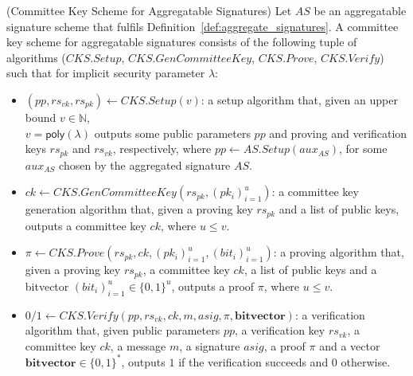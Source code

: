 \begin{definition}
\label{def: committee_key} (Committee Key Scheme for Aggregatable Signatures) Let $\mathit{AS}$ be an aggregatable signature scheme that fulfils 
Definition~\ref{def:aggregate_signatures}.  A committee key scheme for aggregatable signatures consists of the following tuple of algorithms 
($\mathit{CKS.Setup}$, $\mathit{CKS.GenCommitteeKey}$, $\mathit{CKS.Prove}$, $\mathit{CKS.Verify}$) 
such that for implicit security parameter $\lambda$: 

\begin{itemize}
\item $(\mathit{pp}, \mathit{rs}_{\mathit{vk}}, \mathit{rs}_{\mathit{pk}}) \leftarrow \mathit{CKS.Setup}(v)$: a setup algorithm that, 
given an upper bound $v \in \mathbb{N}$, \\ $v = \mathsf{poly}(\lambda)$ outputs some public parameters $\mathit{pp}$ and 
proving and verification keys $\mathit{rs}_{\mathit{pk}}$ and $\mathit{rs}_{\mathit{vk}}$, respectively,  
where $\mathit{pp} \leftarrow \mathit{AS.Setup}(\mathit{aux_{\mathit{AS}}})$, for some 
$\mathit{aux_{\mathit{AS}}}$ chosen by the aggregated signature $\mathit{AS}$.

\item $\mathit{ck} \leftarrow \mathit{CKS.GenCommitteeKey}(\mathit{rs}_{\mathit{pk}}, (\mathit{pk_i})_{i=1}^u)$: a committee key generation algorithm that, 
given a proving key $\mathit{rs}_{\mathit{pk}}$ and a list of public keys, 
outputs a committee key $\mathit{ck}$, where $u \leq v$.

\item $\pi \leftarrow \mathit{CKS.Prove}(\mathit{rs}_{\mathit{pk}}, \mathit{ck}, (\mathit{pk_i})_{i=1}^u, (\mathit{bit_i})_{i=1}^u)$: a proving algorithm that, 
given a proving key $\mathit{rs}_{\mathit{pk}}$, a committee key $\mathit{ck}$, a list of public keys and a bitvector $(\mathit{bit_i})_{i=1}^u \in \{0,1\}^u$,  
outputs a proof $\pi$, where $u \leq v$.
 
\item $0/1 \leftarrow \mathit{CKS.Verify}(\mathit{pp}, \mathit{rs}_{\mathit{vk}}, \mathit{ck}, m, \mathit{asig}, \pi, \mathbf{bitvector})$: a verification algorithm that, 
given public parameters $\mathit{pp}$, a verification key $\mathit{rs}_{\mathit{vk}}$, a committee key $\mathit{ck}$, a message $m$, a 
signature $\mathit{asig}$, a proof $\pi$ and a vector $\mathbf{bitvector} \in \{0,1\}^*$, 
outputs $1$ if the verification succeeds and $0$ otherwise. 
\end{itemize}


\end{definition}
